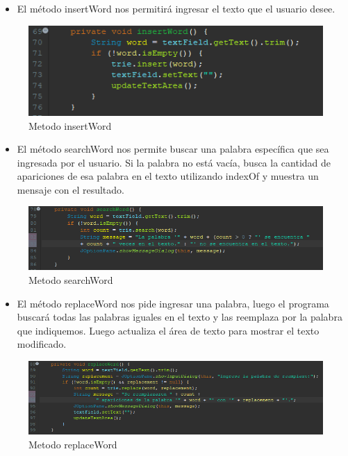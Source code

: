 \documentclass{article}
\begin{document}
          \begin{itemize}
              \item El método insertWord nos permitirá ingresar el texto que el usuario desee.
          \end{itemize}
          \begin{figure}[H]
              \centering
              \includegraphics{img/img3.png}
              \caption{Metodo insertWord}
              \label{fig:enter-label}
          \end{figure}
          \clearpage
          \begin{itemize}
              \item El método searchWord nos permite buscar una palabra específica que sea ingresada por el usuario. Si la palabra no está vacía, busca la cantidad de apariciones de esa palabra en el texto utilizando indexOf y muestra un mensaje con el resultado.
          \end{itemize}
          \begin{figure}[H]
              \centering
              \includegraphics[scale=0.8]{img/img4.png}
              \caption{Metodo searchWord}
              \label{fig:enter-label}
          \end{figure}
          \begin{itemize}
              \item El método replaceWord nos pide ingresar una palabra, luego el programa buscará todas las palabras iguales en el texto y las reemplaza por la palabra que indiquemos. Luego actualiza el área de texto para mostrar el texto modificado.
          \end{itemize}
          \begin{figure}[H]
              \centering
              \includegraphics[scale=0.8]{img/img5.png}
              \caption{Metodo replaceWord}
              \label{fig:enter-label}
          \end{figure}
\end{document}
